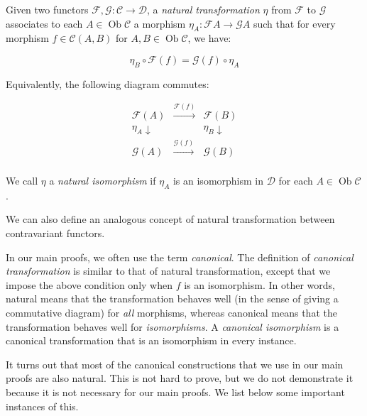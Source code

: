Given two functors $\mathcal{F},\mathcal{G}: \mathcal{C} \to
\mathcal{D}$, a {\em natural transformation} $\eta$ from $\mathcal{F}$
to $\mathcal{G}$ associates to each $A \in
\operatorname{Ob}\mathcal{C}$ a morphism $\eta_A: \mathcal{F}A \to
\mathcal{G}A$ such that for every morphism $f \in \mathcal{C}(A,B)$
for $A,B \in \operatorname{Ob}\mathcal{C}$, we have:

$$\eta_B \circ \mathcal{F}(f) = \mathcal{G}(f) \circ \eta_A$$

Equivalently, the following diagram commutes:

$$\begin{array}{llll}
\mathcal{F}(A) & \stackrel{\mathcal{F}(f)}{\to} & \mathcal{F}(B)\\
\eta_A \downarrow & & \eta_B \downarrow \\
\mathcal{G}(A) & \stackrel{\mathcal{G}(f)}{\to} & \mathcal{G}(B)\\
\end{array}$$

We call $\eta$ a {\em natural isomorphism} if $\eta_A$ is an
isomorphism in $\mathcal{D}$ for each $A \in
\operatorname{Ob}\mathcal{C}$.

We can also define an analogous concept of natural
transformation between contravariant functors.


In our main proofs, we often use the term {\em canonical}. The
definition of {\em canonical transformation} is similar to that of
natural transformation, except that we impose the above condition only
when $f$ is an isomorphism. In other words, natural means that the
transformation behaves well (in the sense of giving a commutative
diagram) for {\em all} morphisms, whereas canonical means that the
transformation behaves well for {\em isomorphisms}. A {\em canonical
  isomorphism} is a canonical transformation that is an isomorphism in
every instance.

It turns out that most of the canonical constructions that we use in
our main proofs are also natural. This is not hard to prove, but we do
not demonstrate it because it is not necessary for our main proofs. We
list below some important instances of this.

